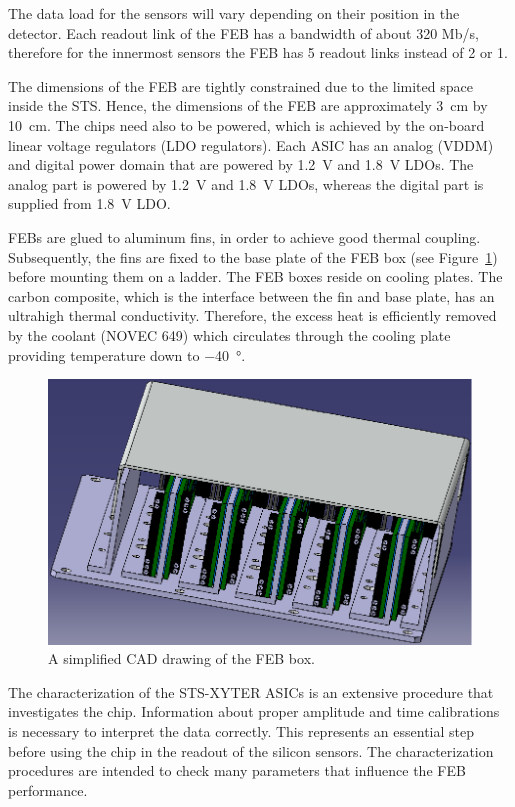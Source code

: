 The data load for the sensors will vary depending on their position in the detector. Each readout link of the \gls{FEB} has a bandwidth of about 320 Mb/s, therefore for the innermost sensors the \gls{FEB} has 5 readout links instead of 2 or 1. 

The dimensions of the \gls{FEB} are tightly constrained due to the limited space inside the \gls{STS}. Hence, the dimensions of the \gls{FEB} are approximately \SI{3}{\centi\metre} by \SI{10}{\centi\metre}. The chips need also to be powered, which is achieved by the on-board linear voltage regulators (\gls{LDO} regulators). Each \gls{ASIC} has an analog (VDDM) and digital power domain that are powered by 1.2~V and 1.8~V \glspl{LDO}. The analog part is powered by 1.2~V and 1.8~V \glspl{LDO}, whereas the digital part is supplied from 1.8~V \gls{LDO}.

\glspl{FEB} are glued to aluminum fins, in order to achieve good thermal coupling. Subsequently, the fins are fixed to the base plate of the \gls{FEB} box (see Figure~\ref{feb_box}) before mounting them on a ladder. The \gls{FEB} boxes reside on cooling plates. The carbon composite, which is the interface between the fin and base plate, has an ultrahigh thermal conductivity. Therefore, the excess heat is efficiently removed by the coolant (NOVEC 649) which circulates through the cooling plate providing temperature down to \SI{-40}{\degree}. 

\begin{figure}[!h]
\centering
\includegraphics[width=0.45\columnwidth]{Chapter2/images/feb_box.png}
\caption{A simplified CAD drawing of the \gls{FEB} box.}
\label{feb_box}
\end{figure}


The characterization of the STS-XYTER ASICs is an extensive procedure that investigates the chip. Information about proper amplitude and time calibrations is necessary to interpret the data correctly. This represents an essential step before using the chip in the readout of the silicon sensors. The characterization procedures are intended to
check many parameters that influence the \gls{FEB} performance. 


